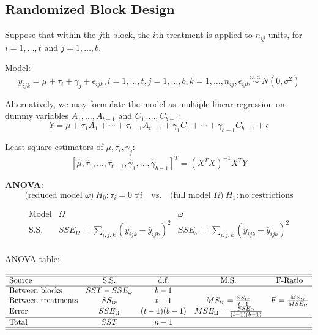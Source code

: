 \documentclass[11pt,a4paper]{article}
\begin{document}
\subsection{Randomized Block Design}
Suppose that within the $j$th block, the $i$th treatment is applied to $n_{ij}$ units, for $i = 1, \dots, t$ and $j = 1, \dots, b$. \par
Model:
\[
y_{ijk} = \mu + \tau_i + \gamma_j + \epsilon_{ijk}, i = 1, \dots, t, j = 1, \dots, b, k = 1, \dots, n_{ij}, \epsilon_{ijk} \overset{\text{i.i.d.}}{\sim} N(0, \sigma^2)
\]

Alternatively, we may formulate the model as multiple linear regression on dummy variables $A_1, \dots, A_{t-1}$ and $C_1, \dots, C_{b-1}$:
\[
Y = \mu + \tau_1 A_1 + \cdots + \tau_{t-1} A_{t-1} + \gamma_1 C_1 + \cdots + \gamma_{b-1} C_{b-1} + \epsilon
\]

Least square estimators of $\mu, \tau_i, \gamma_j$:
\[
\left[\hat{\mu}, \hat{\tau}_1, \dots, \hat{\tau}_{t-1}, \hat{\gamma}_1, \dots, \hat{\gamma}_{b-1}\right]^T = (X^TX)^{-1} X^T Y
\]

\textbf{ANOVA}:
\[
\text{(reduced model $\omega$)}\ H_0: \tau_i = 0\ \forall i
\quad \text{vs.} \quad
\text{(full model $\Omega$)}\ H_1: \text{no restrictions}
\]

\[
\begin{array}{l|cc}
    \text{Model} & \Omega & \omega \\
    \hline
    \text{S.S.} & SSE_{\Omega} = \sum_{i,j,k} (y_{ijk} - \hat{y}_{ijk})^2 & SSE_{\omega} = \sum_{i,j,k} (y_{ijk} - \hat{y}_{ijk})^2 \\
\end{array}
\]

ANOVA table: \par
\[
\begin{array}{lcccc}
    \hline\hline
    \text{Source} & \text{S.S.} & \text{d.f.} & \text{M.S.} & \text{F-Ratio} \\
    \hline
    \text{Between blocks} & SST - SSE_{\omega} & b-1 & & \\
    \text{Between treatments} & SS_{tr} & t-1 & MS_{tr} = \frac{SS_{tr}}{t-1} & F = \frac{MS_{tr}}{MSE_{\Omega}} \\
    \text{Error} & SSE_{\Omega} & (t-1)(b-1) & MSE_{\Omega} = \frac{SSE_{\Omega}}{(t-1)(b-1)} & \\
    \hline
    \text{Total} & SST & n-1 & & \\
    \hline\hline
\end{array}
\]
\end{document}
